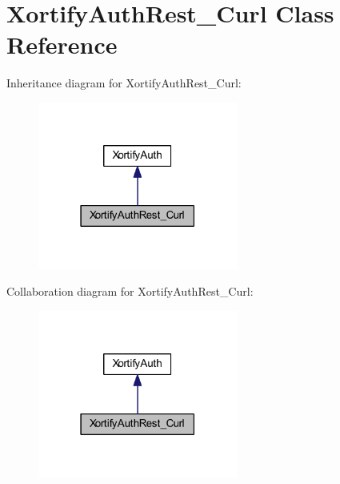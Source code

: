 \hypertarget{class_xortify_auth_rest___curl}{\section{Xortify\-Auth\-Rest\-\_\-\-Curl Class Reference}
\label{class_xortify_auth_rest___curl}
}


Inheritance diagram for Xortify\-Auth\-Rest\-\_\-\-Curl\-:
\nopagebreak
\begin{figure}[H]
\begin{center}
\leavevmode
\includegraphics[width=186pt]{class_xortify_auth_rest___curl__inherit__graph}
\end{center}
\end{figure}


Collaboration diagram for Xortify\-Auth\-Rest\-\_\-\-Curl\-:
\nopagebreak
\begin{figure}[H]
\begin{center}
\leavevmode
\includegraphics[width=186pt]{class_xortify_auth_rest___curl__coll__graph}
\end{center}
\end{figure}
